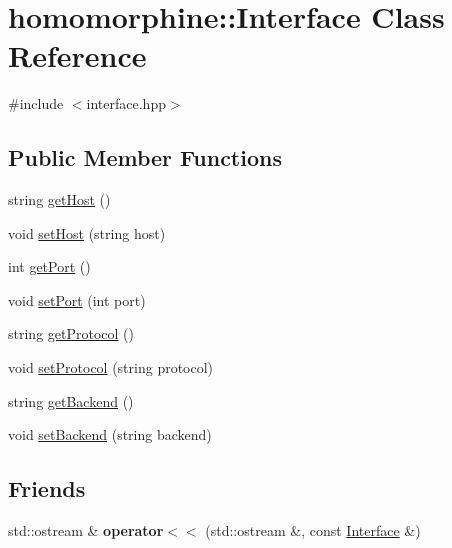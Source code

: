 \hypertarget{classhomomorphine_1_1_interface}{}\section{homomorphine\+:\+:Interface Class Reference}
\label{classhomomorphine_1_1_interface}


{\ttfamily \#include $<$interface.\+hpp$>$}

\subsection*{Public Member Functions}
\begin{DoxyCompactItemize}
\item 
string \hyperlink{classhomomorphine_1_1_interface_a2cd00479c3d14493d31362234f774db9}{get\+Host} ()
\item 
void \hyperlink{classhomomorphine_1_1_interface_aa250a3c50c6eb1236ca6ee978ab474f1}{set\+Host} (string host)
\item 
int \hyperlink{classhomomorphine_1_1_interface_a4433e13909f0e96ab45eeeb9ced8ac56}{get\+Port} ()
\item 
void \hyperlink{classhomomorphine_1_1_interface_a3027f79fe84b8ce6d8d3084771c41e4f}{set\+Port} (int port)
\item 
string \hyperlink{classhomomorphine_1_1_interface_afa73852700146c2957b425c8c0b19c55}{get\+Protocol} ()
\item 
void \hyperlink{classhomomorphine_1_1_interface_a7c4a929fc543c3a5438a5d6f6b3dbc16}{set\+Protocol} (string protocol)
\item 
string \hyperlink{classhomomorphine_1_1_interface_aa52801359888c6758cd4a75d6804eb1e}{get\+Backend} ()
\item 
void \hyperlink{classhomomorphine_1_1_interface_a46885f3cab9a833941201dceb370a6f4}{set\+Backend} (string backend)
\end{DoxyCompactItemize}
\subsection*{Friends}
\begin{DoxyCompactItemize}
\item 
\mbox{\label{classhomomorphine_1_1_interface_ae9184a9fcf19546e0663208ff46f3c37}} 
std\+::ostream \& {\bfseries operator$<$$<$} (std\+::ostream \&, const \hyperlink{classhomomorphine_1_1_interface}{Interface} \&)
\end{DoxyCompactItemize}


